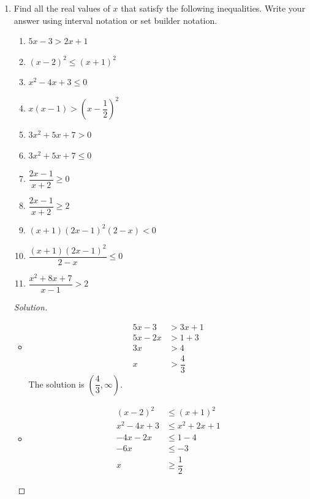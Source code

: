 \documentclass[12pt]{article}
\newenvironment{solution}{\begin{proof}[Solution]}{\end{proof}}
\begin{document}
	\begin{enumerate}
		\item Find all the real values of $x$ that satisfy the following inequalities. Write your answer using interval notation or set builder notation.
		\begin{enumerate}
			\item $5x-3>2x+1$
			
			\item $(x-2)^2\leq (x+1)^2$
			
			\item $x^2-4x+3\leq 0$
			
			
			\item $x(x-1)>(x-\dfrac{1}{2})^2$
			
			\item $3x^2+5x+7>0$
			
			\item $3x^2+5x+7\leq 0$
			
			\item $\dfrac{2x-1}{x+2}\geq 0$
			
			\item $\dfrac{2x-1}{x+2} \geq 2$
			
			\item $(x+1)(2x-1)^2(2-x)<0$
			
			
			\item $\dfrac{(x+1)(2x-1)^2}{2-x}\leq 0$
			
			\item $\dfrac{x^2+8x+7}{x-1}>2$
		\end{enumerate}
		
		\begin{solution}
			\begin{itemize}
				\item[(a)] \begin{align*}
					5x-3&>3x+1\\
					5x-2x&>1+3\\
					3x&>4\\
					x&>\dfrac{4}{3}
				\end{align*} 
				The solution is $\left(\dfrac{4}{3},\infty\right)$.
				\item[(b)] 		\begin{align*}
					(x-2)^2&\leq (x+1)^2\\
					x^2-4x+3 &\leq x^2+2x+1\\
					-4x-2x&\leq 1-4\\
					-6x &\leq -3\\
					x &\geq \dfrac{1}{2}
				\end{align*}
				

\end{itemize}
\end{solution}
\end{enumerate}
\end{document}
